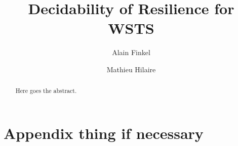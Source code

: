 \documentclass[a4paper,UKenglish,cleveref, autoref, thm-restate]{lipics-v2021}
\title{Decidability of Resilience for WSTS}
\author{Alain Finkel}{}{}{}{}
\author{Mathieu Hilaire}
{Université Paris-Saclay\and CNRS\and ENS Paris-Saclay\and Laboratoire Méthodes Formelles (LMF)\and Gif-sur-Yvette, France}{hilaire@lsv.fr}{}{This work was partly done while the author was supported by the Agence Nationale de la Recherche grant no. (numero de la grant BraVASS).}
\begin{document}
\maketitle


\begin{abstract}
	Here goes the abstract.
\end{abstract}


\newcommand{\LCM}{\mathsf{LCM}}
\newcommand{\LOGSPACE}{\mathsf{LOGSPACE}}
\newcommand{\MSO}{\mathsf{MSO}}
\newcommand{\SO}{\mathsf{SO}}

 \newcommand{\N}{\mathds{N}}



	







% 	






\appendix


\section{Appendix thing if necessary}\label{appendix}
\end{document}
